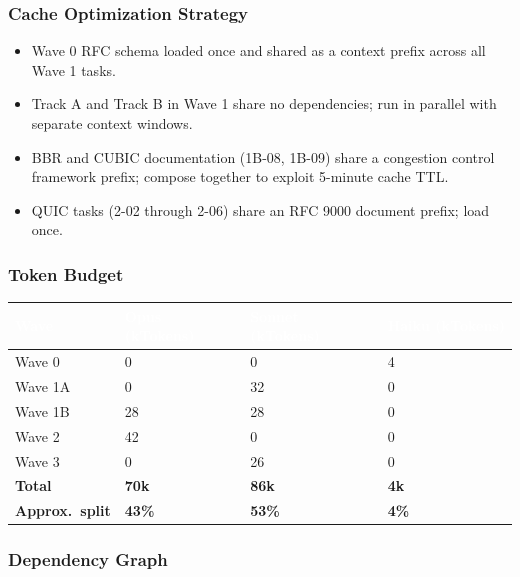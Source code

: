 \documentclass[11pt,letterpaper]{article}
\newcommand{\tableheader}[1]{\textbf{\sffamily\textcolor{white}{#1}}}
\begin{document}
\subsubsection{Cache Optimization Strategy}

\begin{itemize}[noitemsep]
  \item Wave 0 RFC schema loaded once and shared as a context prefix across all Wave 1 tasks.
  \item Track A and Track B in Wave 1 share no dependencies; run in parallel with separate context windows.
  \item BBR and CUBIC documentation (1B-08, 1B-09) share a congestion control framework prefix; compose together to exploit 5-minute cache TTL.
  \item QUIC tasks (2-02 through 2-06) share an RFC 9000 document prefix; load once.
\end{itemize}

\subsubsection{Token Budget}

\begin{center}
\begin{tabularx}{\textwidth}{L{3.5cm}C{2.5cm}C{2.5cm}C{2.5cm}}
\toprule
{}
\tableheader{Wave} & \tableheader{Opus (kTokens)} & \tableheader{Sonnet (kTokens)} & \tableheader{Haiku (kTokens)} \\
\midrule
Wave 0 & 0 & 0 & 4 \\
Wave 1A & 0 & 32 & 0 \\
Wave 1B & 28 & 28 & 0 \\
Wave 2 & 42 & 0 & 0 \\
Wave 3 & 0 & 26 & 0 \\
\midrule
\textbf{Total} & \textbf{70k} & \textbf{86k} & \textbf{4k} \\
\textbf{Approx.\ split} & \textbf{43\%} & \textbf{53\%} & \textbf{4\%} \\
\bottomrule
\end{tabularx}
\end{center}

\subsubsection{Dependency Graph}
\end{document}
